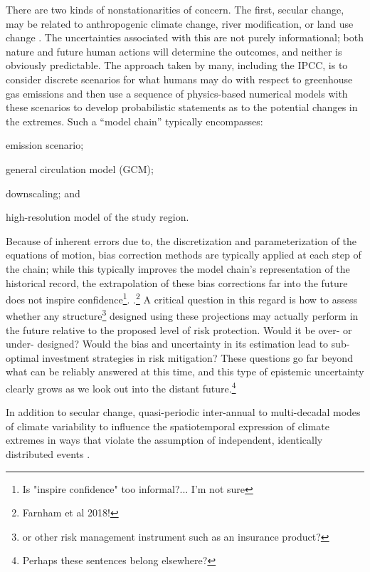 \documentclass[12pt]{article}
\begin{document}
There are two kinds of nonstationarities of concern.
The first, secular change, may be related to anthropogenic climate change, river modification, or land use change \citep{Merz2014}.
The uncertainties associated with this are not purely informational; both nature and future human actions will determine the outcomes, and neither is obviously predictable.
The approach taken by many, including the IPCC, is to consider discrete scenarios for what humans may do with respect to greenhouse gas emissions and then use a sequence of physics-based numerical models with these scenarios to develop probabilistic statements as to the potential changes in the extremes.
Such a ``model chain'' typically encompasses:
\begin{enumerate*}[label= (\roman*) ]
  \item emission scenario;
  \item general circulation model (GCM);
  \item downscaling; and
  \item high-resolution model of the study region.
\end{enumerate*}
Because of inherent errors due to, \eg{} the discretization and parameterization of the equations of motion, bias correction methods are typically applied at each step of the chain; while this typically improves the model chain's representation of the historical record, the extrapolation of these bias corrections far into the future does not inspire confidence\footnote{Is "inspire confidence" too informal?... I'm not sure}. \citep{Dankers2009,Ott2013,Merz2014,Dittes2017}.\footnote{Farnham et al 2018!}
A critical question in this regard is how to assess whether any structure\footnote{or other risk management instrument such as an insurance product?} designed using these projections may actually perform in the future relative to the proposed level of risk protection.
Would it be over- or under- designed?
Would the bias and uncertainty in its estimation lead to sub-optimal investment strategies in risk mitigation?
These questions go far beyond what can be reliably answered at this time, and this type of epistemic uncertainty clearly grows as we look out into the distant future.\footnote{Perhaps these sentences belong elsewhere?}

In addition to secular change, quasi-periodic inter-annual to multi-decadal modes of climate variability \citep[see][]{Hannachi2017} to influence the spatiotemporal expression of climate extremes in ways that violate the assumption of independent, identically distributed events \citep[see][]{Merz2014,Serinaldi2015,Hoskins2015}.
\end{document}
